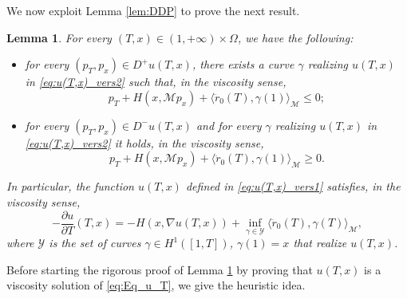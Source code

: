 \documentclass[a4paper,10pt]{amsart}
\theoremstyle{plain}
\newtheorem{lem}[thm]{Lemma}
\theoremstyle{definition}
\numberwithin{equation}{section}
\numberwithin{thm}{section}
\begin{document}
We now exploit Lemma \ref{lem:DDP} to prove the next result.
    \begin{lem}
    \label{lem:Eq_u_T}
    For every $(T,x)\in(1,+\infty)\times\Omega$, we have the following:
    \begin{itemize}
        \item for every $(p_T,p_x) \in D^+ u(T,x)$, there exists a curve $\gamma$ realizing $u(T,x)$ in \eqref{eq:u(T,x)_vers2} such that, in the viscosity sense,
        \[
        p_T+H(x,\mathcal M p_x)+\langle \ddot{r}_0(T), \gamma(1)\rangle_\mathcal{M} \le 0;        \]
        \item for every $(p_T,p_x) \in D^- u(T,x)$ and for every $\gamma$ realizing $u(T,x)$ in \eqref{eq:u(T,x)_vers2} it holds, in the viscosity sense,
        \[
        p_T + H(x, \mathcal M p_x) + \langle \ddot{r}_0(T),\gamma(1)\rangle_\mathcal{M} \geq 0.
        \]
    \end{itemize}

    In particular, the function
        $u(T,x)$ defined in \eqref{eq:u(T,x)_vers1} satisfies, in the viscosity sense,
        \begin{equation}
            \label{eq:Eq_u_T}
           -\frac{\partial u}{\partial T}(T,x)=-H(x,\nabla u(T,x)) + \inf_{\gamma \in \mathcal{Y}}\langle \ddot r_0(T),\gamma(T)\rangle_\mathcal{M},
         \end{equation}
        where $\mathcal Y$ is the set of curves $\gamma \in H^1([1,T])$, $\gamma(1)=x$ that realize $u(T,x)$.
    \end{lem}

    Before starting the rigorous proof of Lemma \ref{lem:Eq_u_T} by proving that $u(T,x)$ is a viscosity solution of \eqref{eq:Eq_u_T}, we give the heuristic idea.
\end{document}
